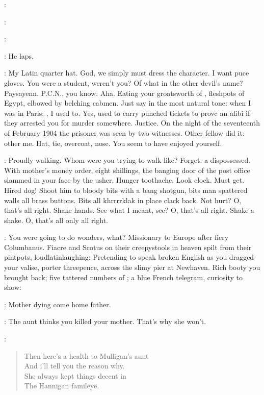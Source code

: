 \patrice:

\Stephen:

\patrice:

\StephenInt:
He laps.

\StephenInt:
My Latin quarter hat.
God, we simply must dress the character.
I want puce gloves.
You were a student, weren't you?
Of what in the other devil's name?
Paysayenn.
P.C.N., you know:
Aha.
Eating your groatsworth of ,
fleshpots of Egypt, elbowed by belching cabmen.
Just say in the most natural tone:
when I was in Paris;
, I used to.
Yes, used to carry punched tickets to prove an alibi
if they arrested you for murder somewhere.
Justice.
On the night of the seventeenth of February 1904
the prisoner was seen by two witnesses.
Other fellow did it:
other me.
Hat, tie, overcoat, nose.
You seem to have enjoyed yourself.

\StephenInt:
Proudly walking.
Whom were you trying to walk like?
Forget:
a dispossessed.
With mother's money order, eight shillings,
the banging door of the post office slammed in your face by the usher.
Hunger toothache.
Look clock.
Must get.
Hired dog!
Shoot him to bloody bits with a bang shotgun,
bits man spattered walls all brass buttons.
Bits all khrrrrklak in place clack back.
Not hurt?
O, that's all right.
Shake hands.
See what I meant, see?
O, that's all right.
Shake a shake.
O, that's all only all right.

\StephenInt:
You were going to do wonders, what?
Missionary to Europe after fiery Columbanus.
Fiacre and Scotus on their creepystools in heaven
spilt from their pintpots, loudlatinlaughing:
Pretending to speak broken English
as you dragged your valise, porter threepence,
across the slimy pier at Newhaven.
Rich booty you brought back;
five tattered numbers of ;
a blue French telegram, curiosity to show:

\simon:
Mother dying come home father.

\buck:
The aunt thinks you killed your mother.
That's why she won't.

:
\begin{verse}
    Then here's a health to Mulligan's aunt \\
    And i'll tell you the reason why. \\
    She always kept things decent in \\
    The Hannigan famileye.
\end{verse}

